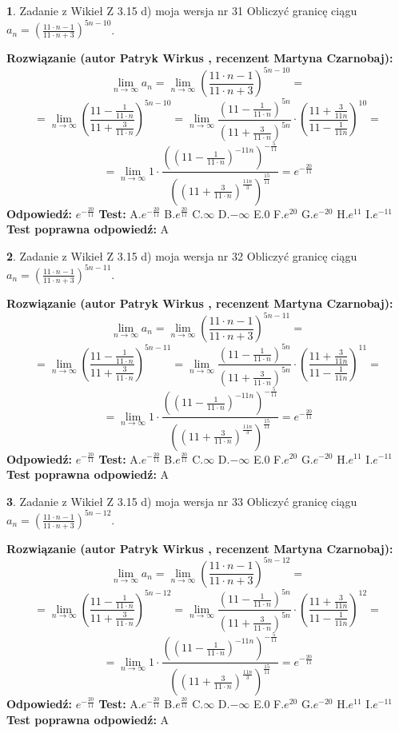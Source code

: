 \documentclass[12pt, a4paper]{article}
\theoremstyle{definition} %
\newtheorem{zad}{}
\newcommand{\zadStart}[1]{\begin{zad}#1\newline}
\newcommand{\zadStop}{\end{zad}}
\newcommand{\rozwStart}[2]{\noindent \textbf{Rozwiązanie (autor #1 , recenzent #2): }\newline}
\newcommand{\rozwStop}{\newline}
\newcommand{\odpStart}{\noindent \textbf{Odpowiedź:}\newline}
\newcommand{\odpStop}{\newline}
\newcommand{\testStart}{\noindent \textbf{Test:}\newline}
\newcommand{\testStop}{\newline}
\newcommand{\kluczStart}{\noindent \textbf{Test poprawna odpowiedź:}\newline}
\newcommand{\kluczStop}{\newline}
\begin{document}
\zadStart{Zadanie z Wikieł Z 3.15 d) moja wersja nr 31}
Obliczyć granicę ciągu $a_{n}=(\frac{11\cdot n - 1}{11 \cdot n + 3})^{5n-10}$.
\zadStop
\rozwStart{Patryk Wirkus}{Martyna Czarnobaj}
$$\lim\limits_{n\to\infty} a_{n} = \lim\limits_{n\to\infty}(\frac{11\cdot n - 1}{11 \cdot n + 3})^{5n-10}=$$
$$=\lim\limits_{n\to\infty}(\frac{11 - \frac{1}{11\cdot n}}{11 + \frac{3}{11 \cdot n}})^{5n-10}=\lim\limits_{n\to\infty}\frac{(11 - \frac{1}{11\cdot n})^{5n}}{(11 + \frac{3}{11\cdot n})^{5n}} \cdot (\frac{11+\frac{3}{11n}}{11-\frac{1}{11n}})^{10}=$$
$$=\lim\limits_{n\to\infty} 1 \cdot \frac{((11-\frac{1}{11 \cdot n})^{-11n})^{-\frac{5}{11}}}{((11+\frac{3}{11 \cdot n})^{\frac{11n}{3}})^{\frac{15}{11}}} =e^{-\frac{20}{11}}$$
\rozwStop
\odpStart
$e^{-\frac{20}{11}}$
\odpStop
\testStart
A.$ e^{-\frac{20}{11}}$
B.$ e^{\frac{20}{11}}$
C.$\infty$
D.$-\infty$
E.$0$
F.$e^{20}$
G.$e^{-20}$
H.$e^{11}$
I.$e^{-11}$
\testStop
\kluczStart
A
\kluczStop



\zadStart{Zadanie z Wikieł Z 3.15 d) moja wersja nr 32}
Obliczyć granicę ciągu $a_{n}=(\frac{11\cdot n - 1}{11 \cdot n + 3})^{5n-11}$.
\zadStop
\rozwStart{Patryk Wirkus}{Martyna Czarnobaj}
$$\lim\limits_{n\to\infty} a_{n} = \lim\limits_{n\to\infty}(\frac{11\cdot n - 1}{11 \cdot n + 3})^{5n-11}=$$
$$=\lim\limits_{n\to\infty}(\frac{11 - \frac{1}{11\cdot n}}{11 + \frac{3}{11 \cdot n}})^{5n-11}=\lim\limits_{n\to\infty}\frac{(11 - \frac{1}{11\cdot n})^{5n}}{(11 + \frac{3}{11\cdot n})^{5n}} \cdot (\frac{11+\frac{3}{11n}}{11-\frac{1}{11n}})^{11}=$$
$$=\lim\limits_{n\to\infty} 1 \cdot \frac{((11-\frac{1}{11 \cdot n})^{-11n})^{-\frac{5}{11}}}{((11+\frac{3}{11 \cdot n})^{\frac{11n}{3}})^{\frac{15}{11}}} =e^{-\frac{20}{11}}$$
\rozwStop
\odpStart
$e^{-\frac{20}{11}}$
\odpStop
\testStart
A.$ e^{-\frac{20}{11}}$
B.$ e^{\frac{20}{11}}$
C.$\infty$
D.$-\infty$
E.$0$
F.$e^{20}$
G.$e^{-20}$
H.$e^{11}$
I.$e^{-11}$
\testStop
\kluczStart
A
\kluczStop



\zadStart{Zadanie z Wikieł Z 3.15 d) moja wersja nr 33}
Obliczyć granicę ciągu $a_{n}=(\frac{11\cdot n - 1}{11 \cdot n + 3})^{5n-12}$.
\zadStop
\rozwStart{Patryk Wirkus}{Martyna Czarnobaj}
$$\lim\limits_{n\to\infty} a_{n} = \lim\limits_{n\to\infty}(\frac{11\cdot n - 1}{11 \cdot n + 3})^{5n-12}=$$
$$=\lim\limits_{n\to\infty}(\frac{11 - \frac{1}{11\cdot n}}{11 + \frac{3}{11 \cdot n}})^{5n-12}=\lim\limits_{n\to\infty}\frac{(11 - \frac{1}{11\cdot n})^{5n}}{(11 + \frac{3}{11\cdot n})^{5n}} \cdot (\frac{11+\frac{3}{11n}}{11-\frac{1}{11n}})^{12}=$$
$$=\lim\limits_{n\to\infty} 1 \cdot \frac{((11-\frac{1}{11 \cdot n})^{-11n})^{-\frac{5}{11}}}{((11+\frac{3}{11 \cdot n})^{\frac{11n}{3}})^{\frac{15}{11}}} =e^{-\frac{20}{11}}$$
\rozwStop
\odpStart
$e^{-\frac{20}{11}}$
\odpStop
\testStart
A.$ e^{-\frac{20}{11}}$
B.$ e^{\frac{20}{11}}$
C.$\infty$
D.$-\infty$
E.$0$
F.$e^{20}$
G.$e^{-20}$
H.$e^{11}$
I.$e^{-11}$
\testStop
\kluczStart
A
\kluczStop
\end{document}
